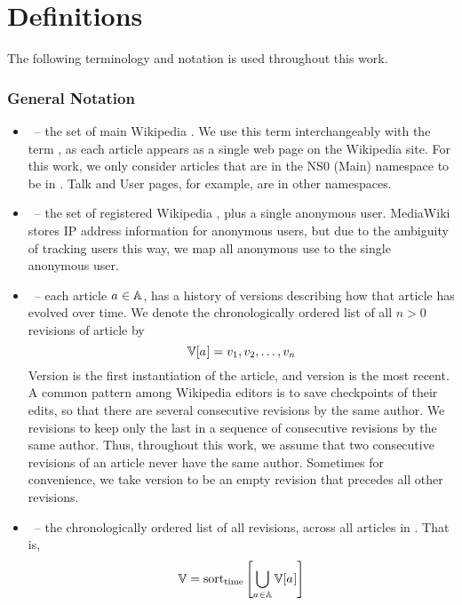 
\chapter{Definitions}
\label{ch:defs}

The following terminology and notation
is used throughout this work.

\renewcommand{\labelitemi}{}

\subsection{General Notation}
\begin{itemize}
\item \articles \ -- the set of main Wikipedia .
    We use this term interchangeably with the term ,
    as each article appears as a single web page on the Wikipedia site.
    For this work, we only consider articles that are in
    the NS0 (Main) namespace to be in \articles.
    Talk and User pages, for example, are in other namespaces.
\item \users \ -- the set of registered Wikipedia ,
    plus a single anonymous user.
    MediaWiki stores IP address information for anonymous users,
    but due to the ambiguity of tracking users this way,
    we map all anonymous use to the single anonymous user.
\item \versions{\article{}} \ -- each article $a_{} \in \mathbb{A}$,
    has a history of versions
    describing how that article has evolved over time.
    We denote the chronologically ordered list
    of all $n > 0$ revisions of article \article{} by
    \begin{equation}
	\versions{\article{}} =
		\version{1}, \version{2}, \ldots, \version{n}
    \end{equation}
    Version  is the first instantiation of the article,
    and version  is the most recent.
    A common pattern among Wikipedia editors is to save checkpoints
    of their edits, so that there are several consecutive revisions by
    the same author.
    We  revisions to keep only the last in a sequence of
    consecutive revisions by the same author.
    Thus, throughout this work, we assume that two consecutive revisions
    of an article never have the same author.
    Sometimes for convenience, we take version  to be
    an empty revision that precedes all other revisions.
\item \versions{} \ -- the chronologically ordered list of all
    revisions, across all articles in \articles.
    That is,
    \begin{equation}
    \versions{} = \mathrm{sort}_\mathrm{time}\left[
	\bigcup_{\article{} \in \articles} \versions{\article{}}
	\right]
    \end{equation}

\end{itemize}

